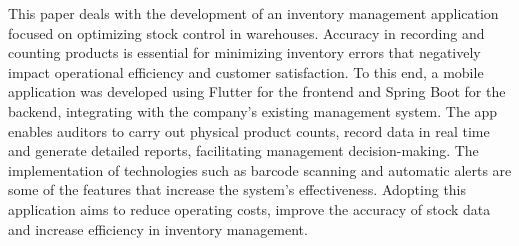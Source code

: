 
This paper deals with the development of an inventory management application focused on optimizing stock control in warehouses. Accuracy in recording and counting products is essential for minimizing inventory errors that negatively impact operational efficiency and customer satisfaction. To this end, a mobile application was developed using Flutter for the frontend and Spring Boot for the backend, integrating with the company’s existing management system. The app enables auditors to carry out physical product counts, record data in real time and generate detailed reports, facilitating management decision-making. The implementation of technologies such as barcode scanning and automatic alerts are some of the features that increase the system’s effectiveness. Adopting this application aims to reduce operating costs, improve the accuracy of stock data and increase efficiency in inventory management.

